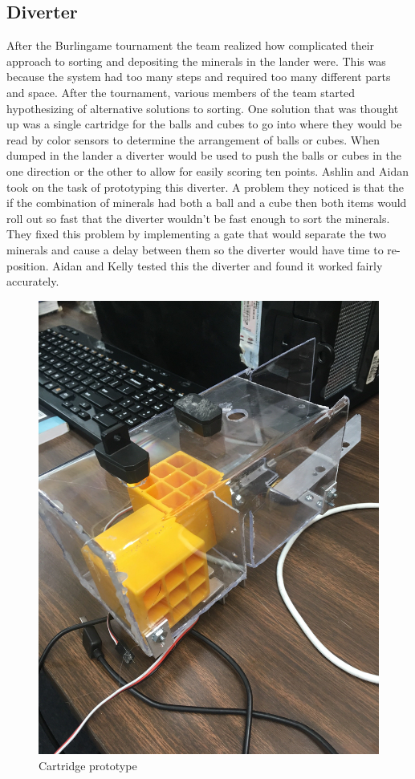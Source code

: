 \documentclass{article}
\begin{document}
\subsection{Diverter}
After the Burlingame tournament the team realized how complicated their approach to sorting and depositing the minerals in the lander were. This was because the system had too many steps and required too many different parts and space. After the tournament, various members of the team started hypothesizing of alternative solutions to sorting. One solution that was thought up was a single cartridge for the balls and cubes to go into where they would be read by color sensors to determine the arrangement of balls or cubes. When dumped in the lander a diverter would be used to push the balls or cubes in the one direction or the other to allow for easily scoring ten points. Ashlin and Aidan took on the task of prototyping this diverter. A problem they noticed is that the if the combination of minerals had both a ball and a cube then both items would roll out so fast that the diverter wouldn't be fast enough to sort the minerals. They fixed this problem by implementing a gate that would separate the two minerals and cause a delay between them so the diverter would have time to re-position. Aidan and Kelly tested this the diverter and found it worked fairly accurately.

\begin{figure}
    \centering
    \includegraphics[width=.6 \textwidth]{14_12-03/images/cartridge1.JPG}
    \caption{Cartridge prototype}
    \label{fig:cartridge}
\end{figure}
\end{document}
